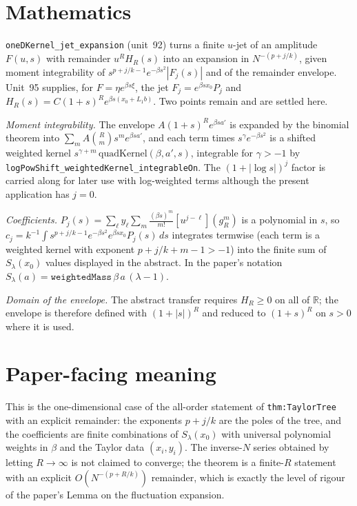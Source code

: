 \documentclass[11pt]{article}
\begin{document}
\section{Mathematics}

\texttt{oneDKernel\_jet\_expansion} (unit~92) turns a finite $u$-jet of an amplitude $F(u,s)$ with
remainder $u^RH_R(s)$ into an expansion in $N^{-(p+j/k)}$, given moment integrability of
$s^{p+j/k-1}e^{-\beta s^2}|F_j(s)|$ and of the remainder envelope. Unit~95 supplies, for
$F=\eta e^{\beta s\xi}$, the jet $F_j=e^{\beta sx_0}P_j$ and
$H_R(s)=C(1+s)^Re^{\beta s(x_0+L_1b)}$. Two points remain and are settled here.

\emph{Moment integrability.} The envelope $A(1+s)^Re^{\beta sa'}$ is expanded by the binomial
theorem into $\sum_mA\binom Rm s^me^{\beta sa'}$, and each term times $s^\gamma e^{-\beta s^2}$ is a
shifted weighted kernel $s^{\gamma+m}\,\mathrm{quadKernel}(\beta,a',s)$, integrable for $\gamma>-1$
by \texttt{logPowShift\_weightedKernel\_integrableOn}. The $(1+|\log s|)^j$ factor is carried along
for later use with log-weighted terms although the present application has $j=0$.

\emph{Coefficients.} $P_j(s)=\sum_\ell y_\ell\sum_m\frac{(\beta s)^m}{m!}[u^{j-\ell}](g_R^m)$ is a
polynomial in $s$, so $c_j=k^{-1}\int s^{p+j/k-1}e^{-\beta s^2}e^{\beta sx_0}P_j(s)\,ds$ integrates
termwise (each term is a weighted kernel with exponent $p+j/k+m-1>-1$) into the finite sum of
$S_\lambda(x_0)$ values displayed in the abstract. In the paper's notation
$S_\lambda(a)=\mathtt{weightedMass}\,\beta\,a\,(\lambda-1)$.

\emph{Domain of the envelope.} The abstract transfer requires $H_R\ge0$ on all of $\mathbb R$; the
envelope is therefore defined with $(1+|s|)^R$ and reduced to $(1+s)^R$ on $s>0$ where it is used.

\section{Paper-facing meaning}

This is the one-dimensional case of the all-order statement of \texttt{thm:TaylorTree} with an
explicit remainder: the exponents $p+j/k$ are the poles of the tree, and the coefficients are finite
combinations of $S_\lambda(x_0)$ with universal polynomial weights in $\beta$ and the Taylor data
$(x_i,y_i)$. The inverse-$N$ series obtained by letting $R\to\infty$ is not claimed to converge; the
theorem is a finite-$R$ statement with an explicit $O(N^{-(p+R/k)})$ remainder, which is exactly
the level of rigour of the paper's Lemma on the fluctuation expansion.
\end{document}
